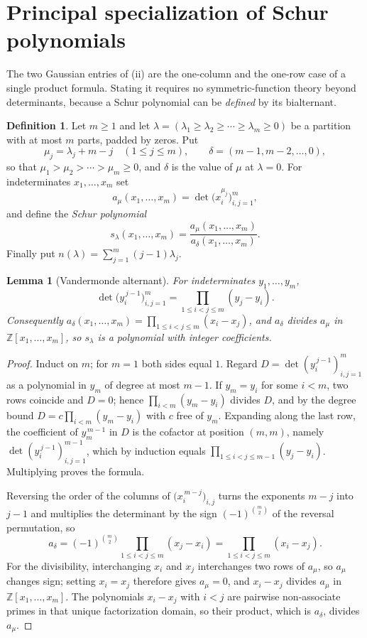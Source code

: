 \documentclass[11pt,oneside,openany]{book}
\newtheorem{lemma}[lemma]{Lemma}
\theoremstyle{definition}
\newtheorem{definition}[definition]{Definition}
\theoremstyle{remark}
\newcommand{\Z}{\mathbb Z}
\begin{document}
\section{Principal specialization of Schur polynomials}

The two Gaussian entries of (ii) are the
one-column and the one-row case of a single product formula.  Stating it
requires no symmetric-function theory beyond determinants, because a Schur
polynomial can be \emph{defined} by its bialternant.

\begin{definition}\label{def:schur-bialternant}
Let $m\ge1$ and let $\lambda=(\lambda_1\ge\lambda_2\ge\cdots\ge\lambda_m\ge0)$
be a partition with at most $m$ parts, padded by zeros.  Put
\[
 \mu_j=\lambda_j+m-j\quad(1\le j\le m),
 \qquad
 \delta=(m-1,m-2,\ldots,0),
\]
so that $\mu_1>\mu_2>\cdots>\mu_m\ge0$, and $\delta$ is the value of $\mu$ at
$\lambda=0$.  For indeterminates $x_1,\ldots,x_m$ set
\[
 a_\mu(x_1,\ldots,x_m)=\det\bigl(x_i^{\mu_j}\bigr)_{i,j=1}^{m},
\]
and define the \emph{Schur polynomial}
\[
 s_\lambda(x_1,\ldots,x_m)
 =\frac{a_\mu(x_1,\ldots,x_m)}{a_\delta(x_1,\ldots,x_m)}.
\]
Finally put $n(\lambda)=\sum_{j=1}^{m}(j-1)\lambda_j$.
\end{definition}

\begin{lemma}[Vandermonde alternant]\label{lem:vandermonde-alternant}
For indeterminates $y_1,\ldots,y_m$,
\[
 \det\bigl(y_i^{\,j-1}\bigr)_{i,j=1}^{m}
 =\prod_{1\le i<j\le m}(y_j-y_i).
\]
Consequently $a_\delta(x_1,\ldots,x_m)=\prod_{1\le i<j\le m}(x_i-x_j)$, and
$a_\delta$ divides $a_\mu$ in $\Z[x_1,\ldots,x_m]$, so $s_\lambda$ is a
polynomial with integer coefficients.
\end{lemma}

\begin{proof}
Induct on $m$; for $m=1$ both sides equal $1$.  Regard
$D=\det(y_i^{\,j-1})_{i,j=1}^{m}$ as a polynomial in $y_m$ of degree at most
$m-1$.  If $y_m=y_i$ for some $i<m$, two rows coincide and $D=0$; hence
$\prod_{i<m}(y_m-y_i)$ divides $D$, and by the degree bound
$D=c\prod_{i<m}(y_m-y_i)$ with $c$ free of $y_m$.  Expanding along the last
row, the coefficient of $y_m^{\,m-1}$ in $D$ is the cofactor at position
$(m,m)$, namely $\det(y_i^{\,j-1})_{i,j=1}^{m-1}$, which by induction equals
$\prod_{1\le i<j\le m-1}(y_j-y_i)$.  Multiplying proves the formula.

Reversing the order of the columns of $\bigl(x_i^{\,m-j}\bigr)_{i,j}$ turns
the exponents $m-j$ into $j-1$ and multiplies the determinant by the sign
$(-1)^{\binom m2}$ of the reversal permutation, so
\[
 a_\delta=(-1)^{\binom m2}\prod_{1\le i<j\le m}(x_j-x_i)
 =\prod_{1\le i<j\le m}(x_i-x_j).
\]
For the divisibility, interchanging $x_i$ and $x_j$ interchanges two rows of
$a_\mu$, so $a_\mu$ changes sign; setting $x_i=x_j$ therefore gives
$a_\mu=0$, and $x_i-x_j$ divides $a_\mu$ in $\Z[x_1,\ldots,x_m]$.  The
polynomials $x_i-x_j$ with $i<j$ are pairwise non-associate primes in that
unique factorization domain, so their product, which is $a_\delta$, divides
$a_\mu$.
\end{proof}
\end{document}
